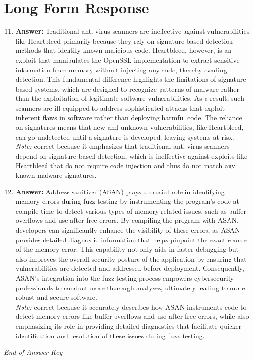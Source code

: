 \documentclass[12pt]{article}
\begin{document}
\section*{Long Form Response}
\begin{enumerate}[label=\arabic*.]
\setcounter{enumi}{10}
\item \textbf{Answer:} Traditional anti-virus scanners are ineffective against vulnerabilities like Heartbleed primarily because they rely on signature-based detection methods that identify known malicious code. Heartbleed, however, is an exploit that manipulates the OpenSSL implementation to extract sensitive information from memory without injecting any code, thereby evading detection. This fundamental difference highlights the limitations of signature-based systems, which are designed to recognize patterns of malware rather than the exploitation of legitimate software vulnerabilities. As a result, such scanners are ill-equipped to address sophisticated attacks that exploit inherent flaws in software rather than deploying harmful code. The reliance on signatures means that new and unknown vulnerabilities, like Heartbleed, can go undetected until a signature is developed, leaving systems at risk.
\\ \textit{Note:} correct because it emphasizes that traditional anti-virus scanners depend on signature-based detection, which is ineffective against exploits like Heartbleed that do not require code injection and thus do not match any known malware signatures.
\item \textbf{Answer:} Address sanitizer (ASAN) plays a crucial role in identifying memory errors during fuzz testing by instrumenting the program's code at compile time to detect various types of memory-related issues, such as buffer overflows and use-after-free errors. By compiling the program with ASAN, developers can significantly enhance the visibility of these errors, as ASAN provides detailed diagnostic information that helps pinpoint the exact source of the memory error. This capability not only aids in faster debugging but also improves the overall security posture of the application by ensuring that vulnerabilities are detected and addressed before deployment. Consequently, ASAN's integration into the fuzz testing process empowers cybersecurity professionals to conduct more thorough analyses, ultimately leading to more robust and secure software.
\\ \textit{Note:} correct because it accurately describes how ASAN instruments code to detect memory errors like buffer overflows and use-after-free errors, while also emphasizing its role in providing detailed diagnostics that facilitate quicker identification and resolution of these issues during fuzz testing.
\end{enumerate}

\vfill
\noindent\textit{End of Answer Key}
\end{document}
